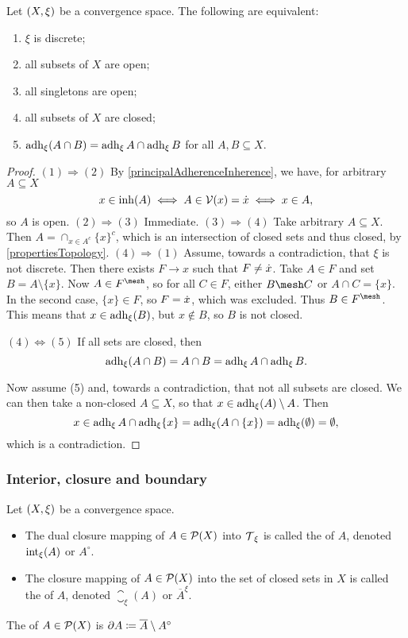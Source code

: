 \begin{proposition} \label{discreteTopologyCharacterisation}
Let $\left( X,\xi \right)$ be a convergence space. The following are equivalent:
\begin{enumerate}
\item $\xi$ is discrete;
\item all subsets of $X$ are open;
\item all singletons are open;
\item all subsets of $X$ are closed;
\item $\operatorname{adh}_\xi(A\cap B) = \operatorname{adh}_\xi A \cap \operatorname{adh}_\xi B$ for all $A,B\subseteq X$.
\end{enumerate}
\end{proposition}
\begin{proof}
$(1) \Rightarrow (2)$ By \ref{principalAdherenceInherence}, we have, for arbitrary $A\subseteq X$
\[ x\in \operatorname{inh}(A) \iff A\in \operatorname{\mathcal{V}}(x) = \dot{x} \iff x\in A, \]
so $A$ is open.
$(2) \Rightarrow (3)$ Immediate.
$(3) \Rightarrow (4)$ Take arbitrary $A\subseteq X$. Then $A = \cap_{x\in A^c}\{x\}^c$, which is an intersection of closed sets and thus closed, by \ref{propertiesTopology}.
$(4) \Rightarrow (1)$ Assume, towards a contradiction, that $\xi$ is not discrete. Then there exists $F\to x$ such that $F \neq \dot{x}$. Take $A\in F$ and set $B = A\setminus\{x\}$. Now $A\in F^\mesh$, so for all $C\in F$, either $B\mesh C$ or $A\cap C = \{x\}$. In the second case, $\{x\}\in F$, so $F = \dot{x}$, which was excluded. Thus $B\in F^\mesh$. This means that $x\in \operatorname{adh}_\xi(B)$, but $x\notin B$, so $B$ is not closed. 

$(4) \Leftrightarrow (5)$ If all sets are closed, then
\[ \operatorname{adh}_\xi(A\cap B) = A\cap B = \operatorname{adh}_\xi A \cap \operatorname{adh}_\xi B. \]

Now assume (5) and, towards a contradiction, that not all subsets are closed. We can then take a non-closed $A\subseteq X$, so that $x\in \operatorname{adh}_\xi(A)\setminus A$. Then
\[ x\in \operatorname{adh}_\xi A \cap \operatorname{adh}_\xi \{x\} = \operatorname{adh}_\xi(A\cap\{x\}) = \operatorname{adh}_\xi(\emptyset) = \emptyset, \]
which is a contradiction.
\end{proof}

\subsubsection{Interior, closure and boundary}
\begin{definition}
Let $\left( X,\xi \right)$ be a convergence space.
\begin{itemize}
\item The dual closure mapping of $A\in \operatorname{\mathcal{P}}(X)$ into $\operatorname{\mathcal{T}}_\xi$ is called the  of $A$, denoted $\operatorname{int}_\xi(A)$ or $A^\circ$. 
\item The closure mapping of $A\in \operatorname{\mathcal{P}}(X)$ into the set of closed sets in $X$ is called the  of $A$, denoted $\closure_\xi(A)$ or $\overline{A}^\xi$. 
\end{itemize}
The  of $A\in\operatorname{\mathcal{P}}(X)$ is $\partial A \coloneqq \overline{A}\setminus A^{\circ}$
\end{definition}

